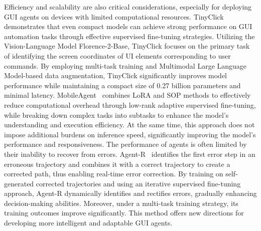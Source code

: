Efficiency and scalability are also critical considerations, especially for deploying GUI agents on devices with limited computational resources. TinyClick~\cite{pawlowski2024tinyclick} demonstrates that even compact models can achieve strong performance on GUI automation tasks through effective supervised fine-tuning strategies. Utilizing the Vision-Language Model Florence-2-Base, TinyClick focuses on the primary task of identifying the screen coordinates of UI elements corresponding to user commands. By employing multi-task training and Multimodal Large Language Model-based data augmentation, TinyClick significantly improves model performance while maintaining a compact size of 0.27 billion parameters and minimal latency.
MobileAgent~\cite{ding2024mobileagentsop} combines LoRA and SOP methods to effectively reduce computational overhead through low-rank adaptive supervised fine-tuning, while breaking down complex tasks into subtasks to enhance the model's understanding and execution efficiency. At the same time, this approach does not impose additional burdens on inference speed, significantly improving the model's performance and responsiveness.
The performance of agents is often limited by their inability to recover from errors. Agent-R~\cite{yuan2025agent} identifies the first error step in an erroneous trajectory and combines it with a correct trajectory to create a corrected path, thus enabling real-time error correction. By training on self-generated corrected trajectories and using an iterative supervised fine-tuning approach, Agent-R dynamically identifies and rectifies errors, gradually enhancing decision-making abilities. Moreover, under a multi-task training strategy, its training outcomes improve significantly. This method offers new directions for developing more intelligent and adaptable GUI agents.


